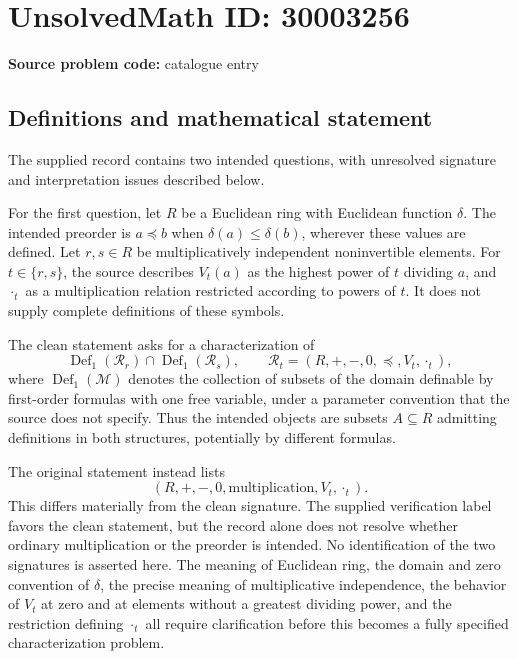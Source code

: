 \documentclass[11pt]{article}
\begin{document}
\section*{UnsolvedMath ID: 30003256}
\textbf{Source problem code:} catalogue entry
\subsection{Definitions and mathematical statement}
The supplied record contains two intended questions, with unresolved signature and interpretation issues described below.

For the first question, let \(R\) be a Euclidean ring with Euclidean function \(\delta\). The intended preorder is \(a\preccurlyeq b\) when \(\delta(a)\leq\delta(b)\), wherever these values are defined. Let \(r,s\in R\) be multiplicatively independent noninvertible elements. For \(t\in\{r,s\}\), the source describes \(V_t(a)\) as the highest power of \(t\) dividing \(a\), and \(\mathbin{\cdot_t}\) as a multiplication relation restricted according to powers of \(t\). It does not supply complete definitions of these symbols.

The clean statement asks for a characterization of
\[
\operatorname{Def}_1(\mathcal R_r)\cap\operatorname{Def}_1(\mathcal R_s),
\qquad
\mathcal R_t=(R,+,-,0,\preccurlyeq,V_t,\mathbin{\cdot_t}),
\]
where \(\operatorname{Def}_1(\mathcal M)\) denotes the collection of subsets of the domain definable by first-order formulas with one free variable, under a parameter convention that the source does not specify. Thus the intended objects are subsets \(A\subseteq R\) admitting definitions in both structures, potentially by different formulas.

The original statement instead lists
\[
(R,+,-,0,\mathrm{multiplication},V_t,\mathbin{\cdot_t}).
\]
This differs materially from the clean signature. The supplied verification label favors the clean statement, but the record alone does not resolve whether ordinary multiplication or the preorder is intended. No identification of the two signatures is asserted here. The meaning of Euclidean ring, the domain and zero convention of \(\delta\), the precise meaning of multiplicative independence, the behavior of \(V_t\) at zero and at elements without a greatest dividing power, and the restriction defining \(\mathbin{\cdot_t}\) all require clarification before this becomes a fully specified characterization problem.
\end{document}

